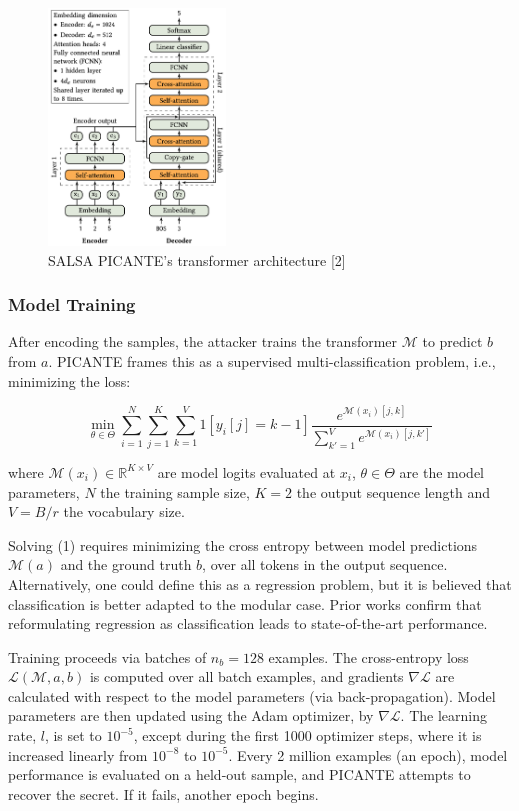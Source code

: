 \documentclass{article}
\begin{document}
\begin{figure}[h]
    \centering
    \includegraphics[width=0.42\textwidth]{Materials/PICANTE_Transformer_architecture.png}
    \caption{SALSA PICANTE's transformer architecture [2]}
    \label{fig:salsa_picante_transformer}
\end{figure}

\subsubsection{Model Training}
After encoding the samples, the attacker trains the transformer \( \mathcal{M} \) to predict \( b \) from \( a \). PICANTE frames this as a supervised multi-classification problem, i.e., minimizing the loss:

\begin{equation}
\min_{\theta \in \Theta} \sum_{i=1}^{N} \sum_{j=1}^{K} \sum_{k=1}^{V} 1[y_i[j] = k-1] \frac{e^{\mathcal{M}(x_i)[j,k]}}{\sum_{k'=1}^{V} e^{\mathcal{M}(x_i)[j,k']}}
\end{equation}

where \( \mathcal{M}(x_i) \in \mathbb{R}^{K \times V} \) are model logits evaluated at \( x_i \), \( \theta \in \Theta \) are the model parameters, \( N \) the training sample size, \( K = 2 \) the output sequence length and \( V = B/r \) the vocabulary size.

Solving (1) requires minimizing the cross entropy between model predictions \( \mathcal{M}(a) \) and the ground truth \( b \), over all tokens in the output sequence. Alternatively, one could define this as a regression problem, but it is believed that classification is better adapted to the modular case. Prior works confirm that reformulating regression as classification leads to state-of-the-art performance.

Training proceeds via batches of \( n_b = 128 \) examples. The cross-entropy loss \( \mathcal{L}(\mathcal{M}, a, b) \) is computed over all batch examples, and gradients \( \nabla \mathcal{L} \) are calculated with respect to the model parameters (via back-propagation). Model parameters are then updated using the Adam optimizer, by \( \nabla \mathcal{L} \). The learning rate, \( l \), is set to \( 10^{-5} \), except during the first 1000 optimizer steps, where it is increased linearly from \( 10^{-8} \) to \( 10^{-5} \). Every 2 million examples (an epoch), model performance is evaluated on a held-out sample, and PICANTE attempts to recover the secret. If it fails, another epoch begins.
\end{document}
